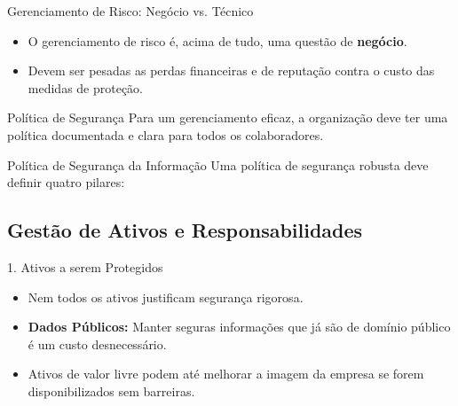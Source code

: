 \documentclass[aspectratio=169]{beamer}
\begin{document}
\begin{frame}{Gerenciamento de Risco: Negócio vs. Técnico}
    \begin{itemize}
        \item O gerenciamento de risco é, acima de tudo, uma questão de \textbf{negócio}.
        \item Devem ser pesadas as perdas financeiras e de reputação contra o custo das medidas de proteção.
    \end{itemize}
    \begin{block}{Política de Segurança}
        Para um gerenciamento eficaz, a organização deve ter uma política documentada e clara para todos os colaboradores.
    \end{block}
\end{frame}

\begin{frame}{Política de Segurança da Informação}
    Uma política de segurança robusta deve definir quatro pilares:
    \centering
\end{frame}

\subsection{Gestão de Ativos e Responsabilidades}
\begin{frame}{1. Ativos a serem Protegidos}
    \begin{itemize}
        \item Nem todos os ativos justificam segurança rigorosa.
        \item \textbf{Dados Públicos:} Manter seguras informações que já são de domínio público é um custo desnecessário.
        \item Ativos de valor livre podem até melhorar a imagem da empresa se forem disponibilizados sem barreiras.
    \end{itemize}
\end{frame}
\end{document}
